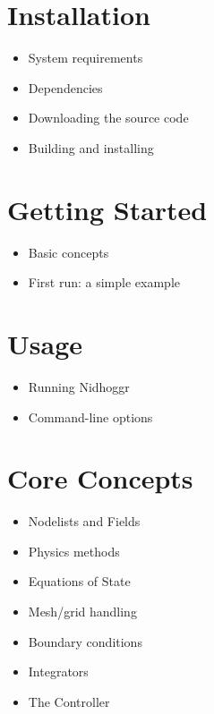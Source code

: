 \documentclass[12pt]{article}
\begin{document}
\newpage
	
	\section{Installation}
	\begin{itemize}
		\item System requirements
		\item Dependencies
		\item Downloading the source code
		\item Building and installing
	\end{itemize}

\newpage
	
	\section{Getting Started}
	\begin{itemize}
		\item Basic concepts
		\item First run: a simple example
	\end{itemize}

\newpage
	
	\section{Usage}
	\begin{itemize}
		\item Running Nidhoggr
		\item Command-line options
	\end{itemize}

\newpage
	
	\section{Core Concepts}
	\begin{itemize}
		\item Nodelists and Fields
		\item Physics methods
		\item Equations of State
		\item Mesh/grid handling
		\item Boundary conditions
		\item Integrators
		\item The Controller
	\end{itemize}

\newpage
	
\end{document}
